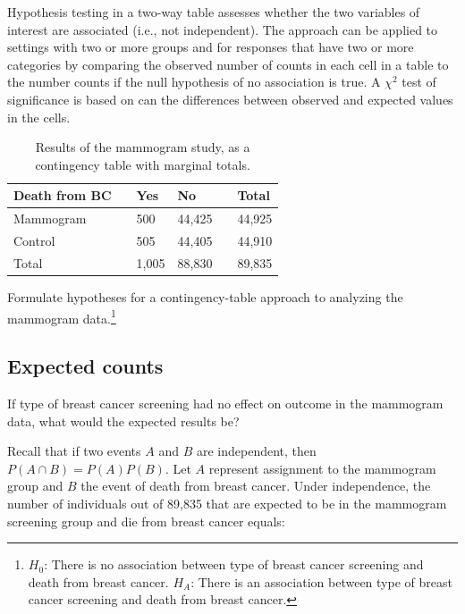 Hypothesis testing in a two-way table assesses whether the two variables of interest are associated (i.e., not independent). The approach can be applied to settings with two or more groups and for responses that have two or more categories by comparing the observed number of counts in each cell in a table to the  number counts if the null hypothesis of no association is true. A $\chi^2$ test of significance is based on can the differences between observed and expected values in the cells.

\begin{table}[h]
	\centering
	\begin{tabular}{l| l l l l |l}
		\hline
		Death from BC & \hspace{1mm}  & Yes & No & \hspace{1mm} & Total \\
		\hline
		Mammogram				   &    & 500 & 44,425 & 				&44,925 \\
		Control				   &     & 505	& 44,405    &				& 44,910 \\
		\hline
		Total						   &    & 1,005 & 88,830 & 				& 89,835 \\
		\hline
	\end{tabular}
	\caption{Results of the mammogram study, as a contingency table with marginal totals.}
	\label{mammogramStudySummaryTableWithTotals}
\end{table}

\begin{exercise}Formulate hypotheses for a contingency-table approach to analyzing the mammogram data.\footnote{$H_0$: There is no association between type of breast cancer screening and death from breast cancer. $H_A$: There is an association between type of breast cancer screening and death from breast cancer.}

\end{exercise}

\subsection{Expected counts}
\label{twoWayTablesExpectedCounts}

If type of breast cancer screening had no effect on outcome in the mammogram data, what would the expected results be? 

Recall that if two events $A$ and $B$ are independent, then $P(A \cap B) = P(A)P(B)$. Let $A$ represent assignment to the mammogram group and $B$ the event of death from breast cancer. Under independence, the number of individuals out of 89,835 that are expected to be in the mammogram screening group and die from breast cancer equals:

